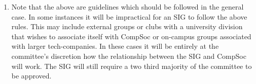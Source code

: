 \begin{enumerate}
\item Note that the above are guidelines which should be followed in the general case. In some instances it will be impractical for an SIG to follow the above rules. This may include external groups or clubs with a university division that wishes to associate itself with CompSoc or on-campus groups associated with larger tech-companies. In these cases it will be entirely at the committee's discretion how the relationship between the SIG and CompSoc will work. The SIG will still require a two third majority of the committee to be approved.

\end{enumerate}
